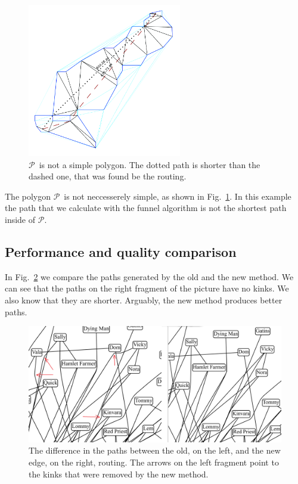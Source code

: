 \documentclass{gd-llncs}
\newcommand{\plg}{$\mathcal{P}$}
\begin{document}
{\begin{figure}[]
  \centering
  \includegraphics*[width=0.6\textwidth]{sleeve_diagonals_not_optimal.pdf}
  \caption{\plg~is not a simple polygon. The dotted path is shorter than the dashed one, that was found be the routing.}
  \label{fig:non_optimal_path}
\end{figure}


The polygon \plg~is not neccesserely simple, as shown in Fig.~\ref{fig:non_optimal_path}.
In this example the path that we calculate with the funnel algorithm is not the shortest path inside of \plg.
\subsection*{Performance and quality comparison}
In Fig.~\ref{fig:improved_routing} we compare the paths generated by the old and the new method. We can see that the paths on the right fragment of the picture have no kinks. We also know that they are shorter. Arguably, the new method produces better paths.
\begin{figure}[]
  \centering
  \includegraphics*[width=1\textwidth]{comparison.png}
  \caption{The difference in the paths between the old, on the left, and the new edge, on the right, routing. The arrows on the left fragment point to the kinks that were removed by the new method.}
  \label{fig:improved_routing}
\end{figure}

}
\end{document}
